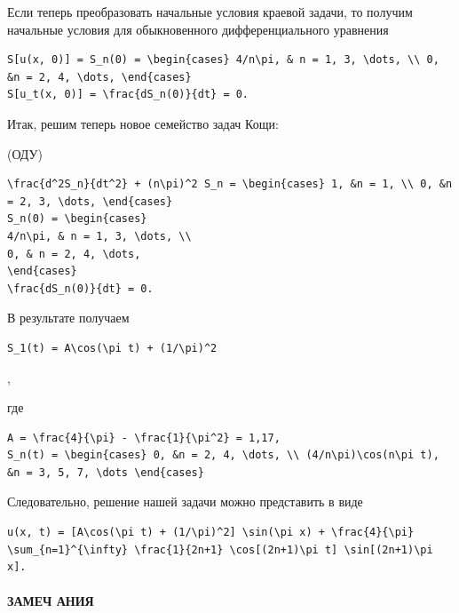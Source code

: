 \documentclass[
  ukrainian,
]{article}
\begin{document}
Если теперь преобразовать начальные условия краевой задачи, то получим
начальные условия для обыкновенного дифференциального уравнения

\begin{verbatim}
S[u(x, 0)] = S_n(0) = \begin{cases} 4/n\pi, & n = 1, 3, \dots, \\ 0, &n = 2, 4, \dots, \end{cases}
S[u_t(x, 0)] = \frac{dS_n(0)}{dt} = 0.
\end{verbatim}

Итак, решим теперь новое семейство задач Кощи:

(ОДУ)

\begin{verbatim}
\frac{d^2S_n}{dt^2} + (n\pi)^2 S_n = \begin{cases} 1, &n = 1, \\ 0, &n = 2, 3, \dots, \end{cases}
S_n(0) = \begin{cases}
4/n\pi, & n = 1, 3, \dots, \\
0, & n = 2, 4, \dots,
\end{cases}
\frac{dS_n(0)}{dt} = 0.
\end{verbatim}

В результате получаем

\begin{verbatim}
S_1(t) = A\cos(\pi t) + (1/\pi)^2
\end{verbatim}

,

где

\begin{verbatim}
A = \frac{4}{\pi} - \frac{1}{\pi^2} = 1,17,
S_n(t) = \begin{cases} 0, &n = 2, 4, \dots, \\ (4/n\pi)\cos(n\pi t), &n = 3, 5, 7, \dots \end{cases}
\end{verbatim}

Следовательно, решение нашей задачи можно представить в виде

\begin{verbatim}
u(x, t) = [A\cos(\pi t) + (1/\pi)^2] \sin(\pi x) + \frac{4}{\pi} \sum_{n=1}^{\infty} \frac{1}{2n+1} \cos[(2n+1)\pi t] \sin[(2n+1)\pi x].
\end{verbatim}

\paragraph{ЗАМЕЧ
АНИЯ}\label{ux437ux430ux43cux435ux447-ux430ux43dux438ux44f}
\end{document}
